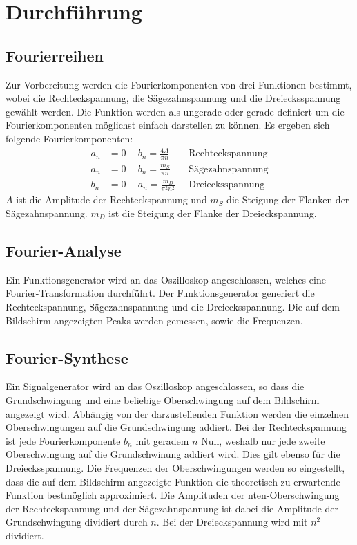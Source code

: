 \section{Durchführung}
\label{sec:Durchführung}

\subsection{Fourierreihen}
Zur Vorbereitung werden die Fourierkomponenten von drei Funktionen bestimmt, wobei
die Rechteckspannung, die Sägezahnspannung und die Dreiecksspannung gewählt werden. Die Funktion werden als ungerade oder
gerade definiert um die Fourierkomponenten möglichst einfach darstellen zu können.
Es ergeben sich folgende Fourierkomponenten:
\begin{align}
  a_n &= 0 \:\: &b_n = \frac{4A}{\pi n}  \:\:\:\:\: &\text{Rechteckspannung} \\
  a_n &= 0 \:\: &b_n = \frac{m_S}{\pi n}   \:\:\:\:\: &\text{Sägezahnspannung} \\
  b_n &= 0 \:\: &a_n = \frac{m_D}{\pi^2 n^2} \:   &\text{Dreiecksspannung}
\end{align}
$A$ ist die Amplitude der Rechteckspannung und $m_S$ die Steigung der Flanken der Sägezahnspannung.
$m_D$ ist die Steigung der Flanke der Dreieckspannung.


\subsection{Fourier-Analyse}
Ein Funktionsgenerator wird an das Oszilloskop angeschlossen, welches eine Fourier-Transformation
durchführt. Der Funktionsgenerator generiert die Rechteckspannung, Sägezahnspannung und die
Dreiecksspannung. Die auf dem Bildschirm angezeigten Peaks werden gemessen, sowie die
Frequenzen.

\subsection{Fourier-Synthese}
Ein Signalgenerator wird an das Oszilloskop angeschlossen, so dass die Grundschwingung und eine
beliebige Oberschwingung auf dem Bildschirm angezeigt wird. Abhängig von der
darzustellenden Funktion werden die einzelnen Oberschwingungen auf die Grundschwingung addiert.
Bei der Rechteckspannung ist jede Fourierkomponente $b_n$ mit geradem $n$ Null, weshalb nur jede zweite
Oberschwingung auf die Grundschwinung addiert wird. Dies gilt ebenso für die Dreiecksspannung.
Die Frequenzen der Oberschwingungen werden so eingestellt, dass die auf dem Bildschirm angezeigte
Funktion die theoretisch zu erwartende Funktion bestmöglich approximiert. Die
Amplituden der nten-Oberschwingung der Rechteckspannung und der Sägezahnspannung ist dabei die Amplitude der Grundschwingung dividiert durch $n$.
Bei der Dreieckspannung wird mit $n^2$ dividiert.

